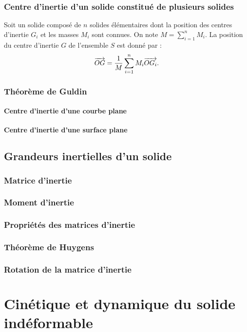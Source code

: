 \documentclass[10pt,fleqn]{article} %
\begin{document}
\subsubsection{Centre d'inertie d'un solide constitué de plusieurs solides}
Soit un solide composé de $n$ solides élémentaires dont la position des centres d'inertie $G_i$ et les masses $M_i$ sont connues. On note $M=\sum\limits_{i=1}^{n}M_i$.  La position du centre d'inertie $G$ de l'ensemble $S$ est donné par :
$$\overrightarrow{OG}=\dfrac{1}{M}\sum\limits_{i=1}^{n}M_i \overrightarrow{OG_i} .$$


\subsubsection{Théorème de Guldin}
\paragraph{Centre d'inertie d'une courbe plane}
\paragraph{Centre d'inertie d'une surface plane}

\subsection{Grandeurs inertielles d'un solide}
\subsubsection{Matrice d'inertie}
\subsubsection{Moment d'inertie}
\subsubsection{Propriétés des matrices d'inertie}
\subsubsection{Théorème de Huygens}
\subsubsection{Rotation de la matrice d'inertie}

\section{Cinétique et dynamique du solide indéformable}
\end{document}
